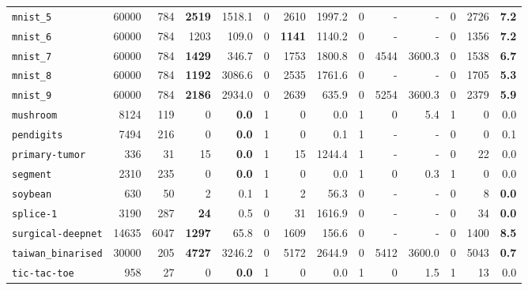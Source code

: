 \begin{tabular}{lccrrrrrrrrrrr}
\texttt{mnist\_5} & \multicolumn{1}{r}{60000} & \multicolumn{1}{r}{784}  & \textbf{2519} & 1518.1 & 0 & 2610 & 1997.2 & 0 & - & - & 0 & 2726 & \textbf{7.2}\\
\texttt{mnist\_6} & \multicolumn{1}{r}{60000} & \multicolumn{1}{r}{784}  & 1203 & 109.0 & 0 & \textbf{1141} & 1140.2 & 0 & - & - & 0 & 1356 & \textbf{7.2}\\
\texttt{mnist\_7} & \multicolumn{1}{r}{60000} & \multicolumn{1}{r}{784}  & \textbf{1429} & 346.7 & 0 & 1753 & 1800.8 & 0 & 4544 & 3600.3 & 0 & 1538 & \textbf{6.7}\\
\texttt{mnist\_8} & \multicolumn{1}{r}{60000} & \multicolumn{1}{r}{784}  & \textbf{1192} & 3086.6 & 0 & 2535 & 1761.6 & 0 & - & - & 0 & 1705 & \textbf{5.3}\\
\texttt{mnist\_9} & \multicolumn{1}{r}{60000} & \multicolumn{1}{r}{784}  & \textbf{2186} & 2934.0 & 0 & 2639 & 635.9 & 0 & 5254 & 3600.3 & 0 & 2379 & \textbf{5.9}\\
\texttt{mushroom} & \multicolumn{1}{r}{8124} & \multicolumn{1}{r}{119}  & 0 & \textbf{0.0} & 1 & 0 & 0.0 & 1 & 0 & 5.4 & 1 & 0 & 0.0\\
\texttt{pendigits} & \multicolumn{1}{r}{7494} & \multicolumn{1}{r}{216}  & 0 & \textbf{0.0} & 1 & 0 & 0.1 & 1 & - & - & 0 & 0 & 0.1\\
\texttt{primary-tumor} & \multicolumn{1}{r}{336} & \multicolumn{1}{r}{31}  & 15 & \textbf{0.0} & 1 & 15 & 1244.4 & 1 & - & - & 0 & 22 & 0.0\\
\texttt{segment} & \multicolumn{1}{r}{2310} & \multicolumn{1}{r}{235}  & 0 & \textbf{0.0} & 1 & 0 & 0.0 & 1 & 0 & 0.3 & 1 & 0 & 0.0\\
\texttt{soybean} & \multicolumn{1}{r}{630} & \multicolumn{1}{r}{50}  & 2 & 0.1 & 1 & 2 & 56.3 & 0 & - & - & 0 & 8 & \textbf{0.0}\\
\texttt{splice-1} & \multicolumn{1}{r}{3190} & \multicolumn{1}{r}{287}  & \textbf{24} & 0.5 & 0 & 31 & 1616.9 & 0 & - & - & 0 & 34 & \textbf{0.0}\\
\texttt{surgical-deepnet} & \multicolumn{1}{r}{14635} & \multicolumn{1}{r}{6047}  & \textbf{1297} & 65.8 & 0 & 1609 & 156.6 & 0 & - & - & 0 & 1400 & \textbf{8.5}\\
\texttt{taiwan\_binarised} & \multicolumn{1}{r}{30000} & \multicolumn{1}{r}{205}  & \textbf{4727} & 3246.2 & 0 & 5172 & 2644.9 & 0 & 5412 & 3600.0 & 0 & 5043 & \textbf{0.7}\\
\texttt{tic-tac-toe} & \multicolumn{1}{r}{958} & \multicolumn{1}{r}{27}  & 0 & \textbf{0.0} & 1 & 0 & 0.0 & 1 & 0 & 1.5 & 1 & 13 & 0.0\\

\end{tabular}
